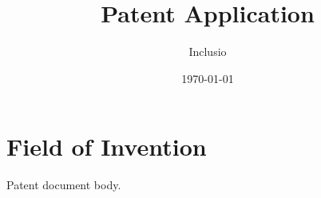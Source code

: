 \documentclass[final,tagged]{pub-patent-us}
\title{Patent Application}
\author{Inclusio}
\date{\today}
\begin{document}
\maketitle

\section{Field of Invention}
Patent document body.
\end{document}
